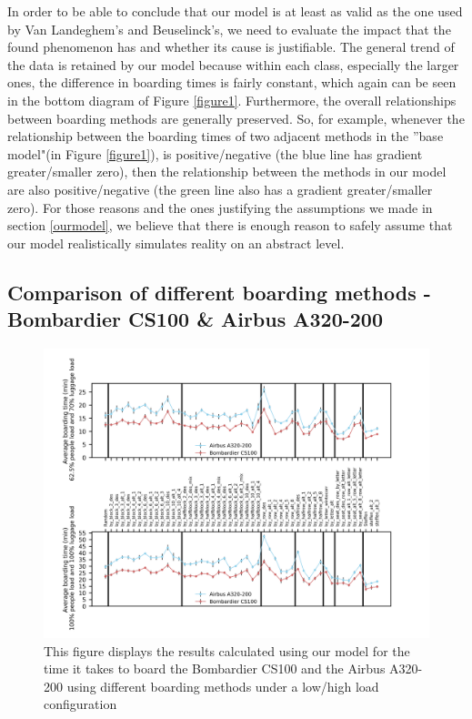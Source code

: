 \documentclass[11pt]{article}
\begin{document}
In order to be able to conclude that our model is at least as valid as the one used by Van Landeghem's and Beuselinck's, we need to evaluate the impact that the found phenomenon has and whether its cause is justifiable. 
The general trend of the data is retained by our model because within each class, especially the larger ones, the difference in boarding times is fairly constant, which again can be seen in the bottom diagram of Figure \ref{figure1}. Furthermore, the overall relationships between boarding methods are generally preserved. So, for example, whenever the relationship between the boarding times of two adjacent methods in the ''base model"(in Figure \ref{figure1}), is positive/negative (the blue line has gradient greater/smaller zero), then the relationship between the methods in our model are also positive/negative (the green line also has a gradient greater/smaller zero). For those reasons and the ones justifying the assumptions we made in section \ref{ourmodel}, we believe that there is enough reason to safely assume that our model realistically simulates reality on an abstract level.  

\subsection{Comparison of different boarding methods - Bombardier CS100 \& Airbus A320-200}
\begin{figure}
	\includegraphics[width=\linewidth]{../../code/AirplaneBoarding/data/figure2/figure2.png}
	\caption{This figure displays the results calculated using our model for the time it takes to board the Bombardier CS100 and the Airbus A320-200 using different boarding methods under a low/high load configuration}
	\label{figure2}
\end{figure}
\end{document}
